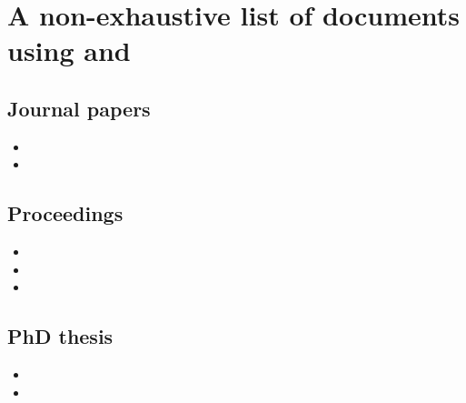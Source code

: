 \chapter[A non-exhastive list of documents using \gaia{} and \sisyphe{}]{A non-exhaustive list of documents using \gaia{} and \sisyphe{}}

\section{Journal papers}
\begin{itemize}
\item {}
\item {}
\end{itemize}
\section{Proceedings}
\begin{itemize}
\item {}
\item {}
\item {}
\end{itemize}

\section{PhD thesis}
\begin{itemize}
\item {}
\item {}
\end{itemize}


